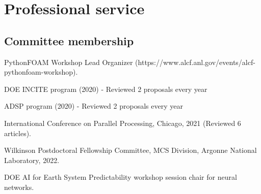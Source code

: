 \documentclass[letterpaper]{article}
\renewenvironment{itemize}{
  \begin{list}{}{
    \setlength{\leftmargin}{1.5em}
  }
}{
  \end{list}
}
\begin{document}


    
    
    

\section*{Professional service}

\subsection*{Committee membership}

\begin{itemize}
\item PythonFOAM Workshop Lead Organizer (https://www.alcf.anl.gov/events/alcf-pythonfoam-workshop).
\item DOE INCITE program (2020) - Reviewed 2 proposals every year
\item ADSP program (2020) - Reviewed 2 proposals every year
\item International Conference on Parallel Processing, Chicago, 2021 (Reviewed 6 articles).
\item Wilkinson Postdoctoral Fellowship Committee, MCS Division, Argonne National Laboratory, 2022.
\item DOE AI for Earth System Predictability workshop session chair for neural networks.
\end{itemize}
\end{document}
